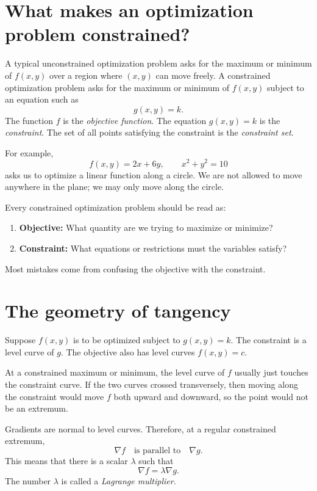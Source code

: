 \documentclass[11pt]{article}
\newcommand{\grad}{\nabla}
\begin{document}
\section{What makes an optimization problem constrained?}

A typical unconstrained optimization problem asks for the maximum or minimum of $f(x,y)$ over a region where $(x,y)$ can move freely. A constrained optimization problem asks for the maximum or minimum of $f(x,y)$ subject to an equation such as
\[
g(x,y)=k.
\]
The function $f$ is the \emph{objective function}. The equation $g(x,y)=k$ is the \emph{constraint}. The set of all points satisfying the constraint is the \emph{constraint set}.

For example,
\[
f(x,y)=2x+6y,\qquad x^2+y^2=10
\]
asks us to optimize a linear function along a circle. We are not allowed to move anywhere in the plane; we may only move along the circle.

\begin{tipbox}
Every constrained optimization problem should be read as:
\begin{enumerate}
  \item \textbf{Objective:} What quantity are we trying to maximize or minimize?
  \item \textbf{Constraint:} What equations or restrictions must the variables satisfy?
\end{enumerate}
Most mistakes come from confusing the objective with the constraint.
\end{tipbox}

\section{The geometry of tangency}

Suppose $f(x,y)$ is to be optimized subject to $g(x,y)=k$. The constraint is a level curve of $g$. The objective also has level curves $f(x,y)=c$.

At a constrained maximum or minimum, the level curve of $f$ usually just touches the constraint curve. If the two curves crossed transversely, then moving along the constraint would move $f$ both upward and downward, so the point would not be an extremum.

Gradients are normal to level curves. Therefore, at a regular constrained extremum,
\[
\grad f \quad \text{is parallel to} \quad \grad g.
\]
This means that there is a scalar $\lambda$ such that
\[
\grad f=\lambda \grad g.
\]
The number $\lambda$ is called a \emph{Lagrange multiplier}.
\end{document}
